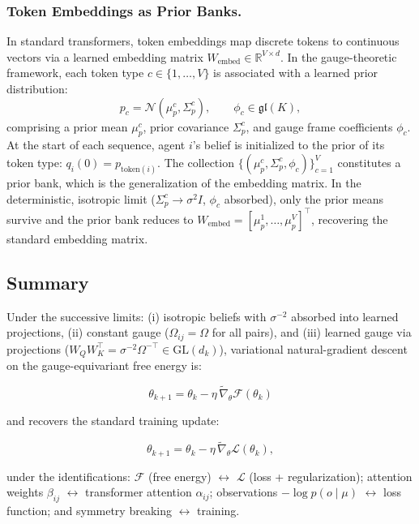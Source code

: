 \documentclass[twoside,11pt]{article}
\begin{document}
\subsubsection{Token Embeddings as Prior Banks.}
\label{sec:embeddings}

In standard transformers, token embeddings map discrete tokens to continuous vectors via a learned embedding matrix $W_{\text{embed}} \in \mathbb{R}^{V \times d}$. In the gauge-theoretic framework, each token type $c \in \{1, \ldots, V\}$ is associated with a learned prior distribution:
\begin{equation}
p_c = \mathcal{N}(\mu_p^c, \Sigma_p^c), \qquad \phi_c \in \mathfrak{gl}(K),
\label{eq:prior_bank}
\end{equation}
comprising a prior mean $\mu_p^c$, prior covariance $\Sigma_p^c$, and gauge frame coefficients $\phi_c$. At the start of each sequence, agent $i$'s belief is initialized to the prior of its token type: $q_i(0) = p_{\mathrm{token}(i)}$. The collection $\{(\mu_p^c, \Sigma_p^c, \phi_c)\}_{c=1}^V$ constitutes a prior bank, which is the generalization of the embedding matrix. In the deterministic, isotropic limit ($\Sigma_p^c \to \sigma^2 I$, $\phi_c$ absorbed), only the prior means survive and the prior bank reduces to $W_{\text{embed}} = [\mu_p^1, \ldots, \mu_p^V]^\top$, recovering the standard embedding matrix.


\subsection{Summary}

Under the successive limits: (i) isotropic beliefs with $\sigma^{-2}$ absorbed into learned projections, (ii) constant gauge ($\Omega_{ij} = \Omega$ for all pairs), and (iii) learned gauge via projections ($W_Q W_K^\top = \sigma^{-2}\Omega^{-\top} \in \mathrm{GL}(d_k)$), variational natural-gradient descent on the gauge-equivariant free energy is:

\begin{equation}
\theta_{k+1} = \theta_k - \eta \,\tilde{\nabla}_\theta \mathcal{F}(\theta_k)
\end{equation}

and recovers the standard training update:

\begin{equation}
\theta_{k+1} = \theta_k - \eta \,\tilde{\nabla}_\theta \mathcal{L}(\theta_k),
\end{equation}

under the identifications: $\mathcal{F}$ (free energy) $\leftrightarrow$ $\mathcal{L}$ (loss + regularization); attention weights $\beta_{ij}$ $\leftrightarrow$ transformer attention $\alpha_{ij}$; observations $-\log p(o \mid \mu)$ $\leftrightarrow$ loss function; and symmetry breaking $\leftrightarrow$ training.
\end{document}
